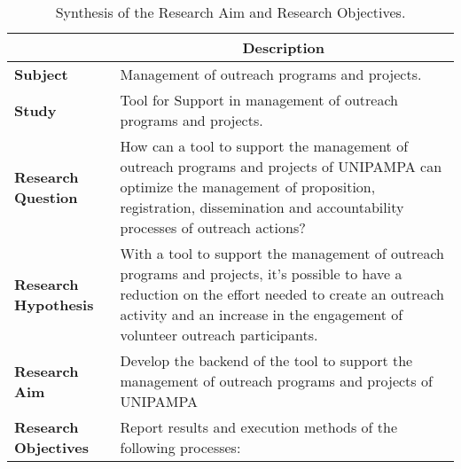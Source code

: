\begin{table}[!htb]
  \centering
  \caption{Synthesis of the Research Aim and Research Objectives.}
  \label{tbl:tableObjectives}
  \footnotesize
  \begin{tabular}{l|p{11cm}}
    \bottomrule
    \rowcolor[rgb]{0.749,0.749,0.749} \multicolumn{1}{c|}{\textbf{Topic}}                  & \multicolumn{1}{c}{\textbf{Description}}                                                                                                                                                                                             \\
    \hline
    \rowcolor[rgb]{0.898,0.898,0.898} \textcolor[rgb]{0.145,0.145,0.145}{\textbf{Subject}} & Management of outreach programs and projects.                                                                                                                                                                                        \\
    \textbf{Study}                                                                         & Tool for Support in management of outreach programs and projects.                                                                                                                                                                    \\
    \rowcolor[rgb]{0.898,0.898,0.898} \textbf{Research Question}                           & How can a tool to support the management of outreach programs and projects of \acs{UNIPAMPA} can optimize the management of proposition, registration, dissemination and accountability processes of outreach actions?               \\
    \textcolor[rgb]{0.145,0.145,0.145}{\textbf{Research Hypothesis}}                       & With a tool to support the management of outreach programs and projects, it's possible to have a reduction on the effort needed to create an outreach activity and an increase in the engagement of volunteer outreach participants. \\
    \rowcolor[rgb]{0.898,0.898,0.898} \textbf{Research Aim}                                & Develop the backend of the tool to support the management of outreach programs and projects of \acs{UNIPAMPA}                                                                                                                       \\
    \textbf{Research Objectives}                                                           & Report results and execution methods of the following processes:

\end{tabular}
\end{table}
